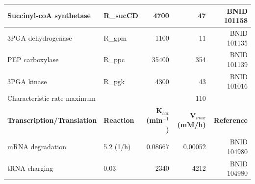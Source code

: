 \documentclass[12pt]{article}
\begin{document}
\begin{table}
\begin{tabular}{llrrr}
\phantom{i}Succinyl-coA synthetase & R\_sucCD & 4700 & 47 & BNID 101158 \\ \hline
\phantom{i}3PGA dehydrogenase & R\_gpm & 1100 & 11 & BNID 101135 \\ \hline
\phantom{i}PEP carboxylase & R\_ppc & 35400 & 354 & BNID 101139 \\ \hline
\phantom{i}3PGA kinase & R\_pgk & 4300 & 43 & BNID 101016 \\ \midrule
\phantom{i}Characteristic rate maximum & & & 110 & \\ \toprule
\phantom{i}\textbf{Transcription\slash Translation} & \textbf{Reaction} & \textbf{K$_{cat}$ (min$^{-1}$)} & \textbf{V$_{max}$ (mM/h)} & \textbf{Reference} \\ \hline
\phantom{i}mRNA degradation & 5.2 (1/h) & 0.08667 & 0.00052 & BNID 104980 \\ \hline
\phantom{i}tRNA charging & 0.03 & 2340 & 4212 & BNID 104980 \\ \hline
 \end{tabular}
\label{tbl:Rate_maxima}
\end{table}
\end{document}
